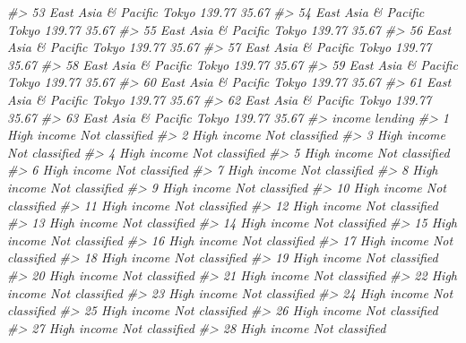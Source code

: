 \documentclass[
  xelatex, ja=standard]{bxjsbook}
\newenvironment{Shaded}{\begin{snugshade}}{\end{snugshade}}
\newcommand{\CommentTok}[1]{\textcolor[rgb]{0.56,0.35,0.01}{\textit{#1}}}
\theoremstyle{definition}
\theoremstyle{definition}
\theoremstyle{definition}
\theoremstyle{definition}
\theoremstyle{remark}
\begin{document}
\begin{Shaded}
\begin{Highlighting}[]
\CommentTok{\#\textgreater{} 53 East Asia \& Pacific   Tokyo    139.77    35.67}
\CommentTok{\#\textgreater{} 54 East Asia \& Pacific   Tokyo    139.77    35.67}
\CommentTok{\#\textgreater{} 55 East Asia \& Pacific   Tokyo    139.77    35.67}
\CommentTok{\#\textgreater{} 56 East Asia \& Pacific   Tokyo    139.77    35.67}
\CommentTok{\#\textgreater{} 57 East Asia \& Pacific   Tokyo    139.77    35.67}
\CommentTok{\#\textgreater{} 58 East Asia \& Pacific   Tokyo    139.77    35.67}
\CommentTok{\#\textgreater{} 59 East Asia \& Pacific   Tokyo    139.77    35.67}
\CommentTok{\#\textgreater{} 60 East Asia \& Pacific   Tokyo    139.77    35.67}
\CommentTok{\#\textgreater{} 61 East Asia \& Pacific   Tokyo    139.77    35.67}
\CommentTok{\#\textgreater{} 62 East Asia \& Pacific   Tokyo    139.77    35.67}
\CommentTok{\#\textgreater{} 63 East Asia \& Pacific   Tokyo    139.77    35.67}
\CommentTok{\#\textgreater{}         income        lending}
\CommentTok{\#\textgreater{} 1  High income Not classified}
\CommentTok{\#\textgreater{} 2  High income Not classified}
\CommentTok{\#\textgreater{} 3  High income Not classified}
\CommentTok{\#\textgreater{} 4  High income Not classified}
\CommentTok{\#\textgreater{} 5  High income Not classified}
\CommentTok{\#\textgreater{} 6  High income Not classified}
\CommentTok{\#\textgreater{} 7  High income Not classified}
\CommentTok{\#\textgreater{} 8  High income Not classified}
\CommentTok{\#\textgreater{} 9  High income Not classified}
\CommentTok{\#\textgreater{} 10 High income Not classified}
\CommentTok{\#\textgreater{} 11 High income Not classified}
\CommentTok{\#\textgreater{} 12 High income Not classified}
\CommentTok{\#\textgreater{} 13 High income Not classified}
\CommentTok{\#\textgreater{} 14 High income Not classified}
\CommentTok{\#\textgreater{} 15 High income Not classified}
\CommentTok{\#\textgreater{} 16 High income Not classified}
\CommentTok{\#\textgreater{} 17 High income Not classified}
\CommentTok{\#\textgreater{} 18 High income Not classified}
\CommentTok{\#\textgreater{} 19 High income Not classified}
\CommentTok{\#\textgreater{} 20 High income Not classified}
\CommentTok{\#\textgreater{} 21 High income Not classified}
\CommentTok{\#\textgreater{} 22 High income Not classified}
\CommentTok{\#\textgreater{} 23 High income Not classified}
\CommentTok{\#\textgreater{} 24 High income Not classified}
\CommentTok{\#\textgreater{} 25 High income Not classified}
\CommentTok{\#\textgreater{} 26 High income Not classified}
\CommentTok{\#\textgreater{} 27 High income Not classified}
\CommentTok{\#\textgreater{} 28 High income Not classified}

\end{Highlighting}
\end{Shaded}
\end{document}
